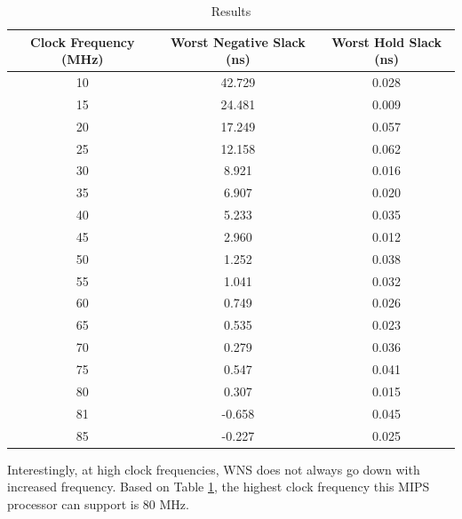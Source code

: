 \documentclass[CMPE]{KGCOEReport}
\begin{document}
\begin{table}[H]
    \center
	\caption{Results}
	\begin{tabular}{ccc}
		Clock Frequency (MHz) & Worst Negative Slack (ns) & Worst Hold Slack (ns) \\
		\hline
		\hline
		10                    & 42.729                    & 0.028                 \\
		15                    & 24.481                    & 0.009                 \\
		20                    & 17.249                    & 0.057                 \\
		25                    & 12.158                    & 0.062                 \\
		30                    & 8.921                     & 0.016                 \\
		35                    & 6.907                     & 0.020                 \\
		40                    & 5.233                     & 0.035                 \\
		45                    & 2.960                     & 0.012                 \\
		50                    & 1.252                     & 0.038                 \\
		55                    & 1.041                     & 0.032                 \\
		60                    & 0.749                     & 0.026                 \\
		65                    & 0.535                     & 0.023                 \\
		70                    & 0.279                     & 0.036                 \\
		75                    & 0.547                     & 0.041                 \\
		80                    & 0.307                     & 0.015                 \\
		81                    & -0.658                    & 0.045                 \\
		85                    & -0.227                    & 0.025                 \\
		\hline
		\hline
	\end{tabular}
	\label{tab}
\end{table}

Interestingly, at high clock frequencies, WNS does not always go down with
increased frequency. Based on Table \ref{tab}, the highest clock frequency this
MIPS processor can support is 80 MHz.
\end{document}
